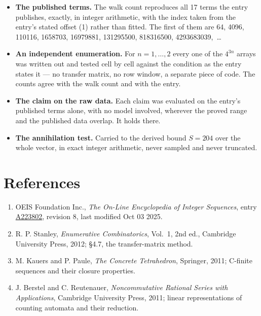 \documentclass[11pt]{article}
\theoremstyle{definition}
\begin{document}
\begin{itemize}

\item {\bfseries The published terms.} The walk count reproduces all 17 terms the entry publishes, exactly, in integer arithmetic, with the index taken from the entry's stated offset (1) rather than fitted. The first of them are 64, 4096, 110116, 1658703, 16979881, 131295500, 818316500, 4293683039,~\dots

\item {\bfseries An independent enumeration.} For $n = 1,\dots,2$ every one of the $4^{3n}$ arrays was written out and tested cell by cell against the condition as the entry states it --- no transfer matrix, no row window, a separate piece of code. The counts agree with the walk count and with the entry.

\item {\bfseries The claim on the raw data.} Each claim was evaluated on the entry's published terms alone, with no model involved, wherever the proved range and the published data overlap. It holds there.

\item {\bfseries The annihilation test.} Carried to the derived bound $S = 204$ over the whole vector, in exact integer arithmetic, never sampled and never truncated.

\end{itemize}

\section{References}

\begin{enumerate}

\item OEIS Foundation Inc., \emph{The On-Line Encyclopedia of Integer Sequences}, entry \href{https://oeis.org/A223802}{A223802}, revision 8, last modified Oct 03 2025.

\item R. P. Stanley, \emph{Enumerative Combinatorics}, Vol.~1, 2nd ed., Cambridge University Press, 2012; \S4.7, the transfer-matrix method.

\item M. Kauers and P. Paule, \emph{The Concrete Tetrahedron}, Springer, 2011; C-finite sequences and their closure properties.

\item J. Berstel and C. Reutenauer, \emph{Noncommutative Rational Series with Applications}, Cambridge University Press, 2011; linear representations of counting automata and their reduction.

\end{enumerate}
\end{document}
